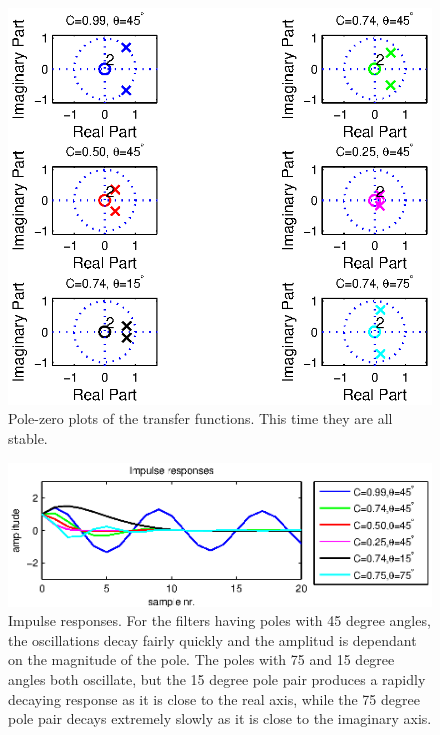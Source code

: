 \begin{figure}
	\center
	\includegraphics{./picture/ha6_1_4_zplane.eps}
	\caption{Pole-zero plots of the transfer functions. This time they are all stable.}
	\label{fig:1.4.zplane}
\end{figure}

\begin{figure}
	\center
	\includegraphics{./picture/ha6_1_4_impz.eps}
	\caption{Impulse responses. For the filters having poles with 45 degree angles, the oscillations decay fairly quickly and the amplitud is dependant on the magnitude of the pole. The poles with 75 and 15 degree angles both oscillate, but the 15 degree pole pair produces a rapidly decaying response as it is close to the real axis, while the 75 degree pole pair decays extremely slowly as it is close to the imaginary axis.}
	\label{fig:1.4.impz}
\end{figure}

